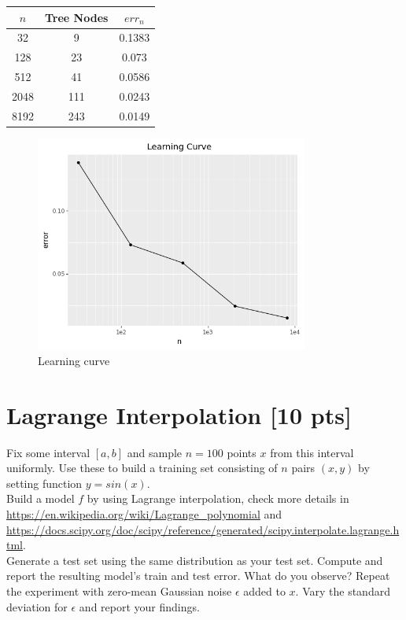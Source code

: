 \documentclass[a4paper]{article}
\theoremstyle{definition}
\newenvironment{soln}{
    \leavevmode\color{blue}\ignorespaces
}{}
\begin{document}
\begin{soln}
  \begin{center}
    \begin{tabular}{|c|c|c|}
      \hline
      $n$ & Tree Nodes & $err_n$ \\
      \hline
      32  &  9  &  0.1383  \\
      128  &  23  &  0.073  \\
      512  &  41  &  0.0586  \\
      2048  &  111  &  0.0243  \\
      8192  &  243  &  0.0149  \\
      \hline
    \end{tabular}
  \end{center}

  \begin{figure}[H]
    \centering
    \includegraphics[width=0.8\textwidth]{../plots/sklearn_error_curve.png}
    \caption{Learning curve}
    \label{fig:sklearn_error_curve} 
  \end{figure}
\end{soln}

\section{Lagrange Interpolation [10 pts]}
Fix some interval $[a, b]$ and sample $n = 100$ points $x$ from this interval uniformly. Use these to build a training set consisting of $n$ pairs $(x, y)$ by setting function $y = sin(x)$. \\

Build a model $f$ by using Lagrange interpolation, check more details in \url{https://en.wikipedia.org/wiki/Lagrange_polynomial} and \url{https://docs.scipy.org/doc/scipy/reference/generated/scipy.interpolate.lagrange.html}. \\

Generate a test set using the same distribution as your test set. Compute and report the resulting model’s train and test error. What do you observe?
Repeat the experiment with zero-mean Gaussian noise $\epsilon$ added to $x$. Vary the standard deviation for $\epsilon$ and report your findings.


\end{document}
